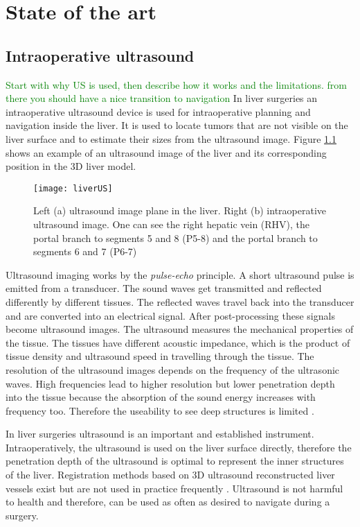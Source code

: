 \chapter{State of the art}

\section{Intraoperative ultrasound}
\textcolor{green}{Start with why US is used, then describe how it works and the limitations. from there you should have a nice transition to navigation}
In
liver surgeries an intraoperative ultrasound device is used for intraoperative planning and
navigation inside the liver. It is used to locate tumors that are not
visible on the liver surface and to estimate their sizes from the ultrasound image. Figure \ref{fig:liverUS} shows an example of an
ultrasound image of the liver and its corresponding position in the 3D liver
model.

\begin{figure}[H]
  \centering
 \texttt{[image: liverUS]}
 \caption{ Left (a) ultrasound image plane in the liver. Right (b) intraoperative
   ultrasound image. One can see the right hepatic vein (RHV), the portal branch
   to segments 5 and 8 (P5-8) and the portal branch to segments 6 and 7 (P6-7) \cite{torzilli2014ultrasound}}
  \label{fig:liverUS}
\end{figure}

Ultrasound imaging works by the \textit{pulse-echo} principle. A short
ultrasound pulse is emitted from a transducer. The sound waves get
transmitted and reflected differently by different tissues. The reflected
 waves travel back into the transducer and are converted into an electrical
signal. After post-processing these signals become ultrasound images. 
The ultrasound measures the mechanical properties of the tissue. The tissues
have different acoustic impedance, which is the product of tissue density and
ultrasound speed in travelling through the tissue. The resolution of the
ultrasound images depends on the frequency of the ultrasonic waves. High
frequencies lead to higher resolution but lower penetration depth into the tissue because the
absorption of the sound energy increases with frequency too. Therefore the
useability to see deep structures is limited \cite{torzilli2014ultrasound}. 

In liver surgeries ultrasound is an important and established instrument.
Intraoperatively, the ultrasound is used on the liver surface directly,
therefore the penetration depth of the
ultrasound is optimal to represent the inner structures of the liver.
Registration methods based on 3D ultrasound reconstructed liver vessels 
exist but are not used in practice frequently \cite{lange2003vessel}. Ultrasound
is not harmful to health and therefore, can
be used as often as desired to navigate during a surgery.

